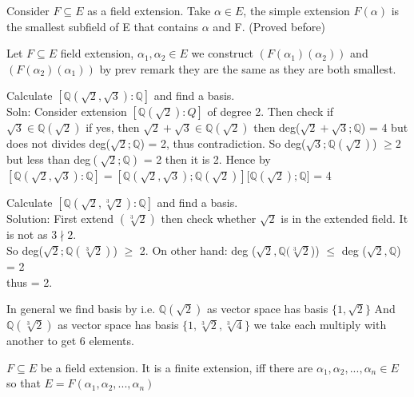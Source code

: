 \documentclass{article}
\newcommand\Q{\ensuremath{\mathbb{Q}}}
\begin{document}
\begin{note}
    Consider $F \subseteq E$ as a field extension. Take $\alpha \in E$, the simple extension $F(\alpha)$ is the smallest subfield of E that contains $\alpha$ and F. (Proved before)
\end{note}
\begin{Def}
    Let $F \subseteq E$ field extension, $\alpha_1, \alpha_2 \in E$ we construct $(F(\alpha_1)(\alpha_2))$ and $(F(\alpha_2)(\alpha_1))$ by prev remark they are the same as they are both smallest.
\end{Def}

\begin{Example}
    Calculate $[\Q(\sqrt{2}, \sqrt{3}): \Q]$ and find a basis.
  \\  Soln: Consider extension $[\Q(\sqrt{2}):Q]$ of degree 2. Then check if $\sqrt{3} \in \Q(\sqrt{2})$ if yes, then $\sqrt{2} + \sqrt{3} \in \Q(\sqrt{2})$ then deg($\sqrt{2} + \sqrt{3}; 
    \Q$) = 4 but does not divides deg($\sqrt{2}; \Q$) = 2, thus contradiction.
    So deg($\sqrt{3}; \Q(\sqrt{2})$) $\geq 2$ but less than deg$(\sqrt{2}; \Q)$ = 2 then it is 2.
    Hence by $[\Q(\sqrt{2}, \sqrt{3}):\Q] = [\Q(\sqrt{2}, \sqrt{3}); \Q(\sqrt{2})][\Q(\sqrt{2}); \Q$] = 4
\end{Example}


\begin{Example}
      Calculate $[\Q(\sqrt{2}, \sqrt[3]{2}): \Q]$ and find a basis. 
\\Solution: First extend $( \sqrt[3]{2})$ then check whether $\sqrt{2}$ is in the extended field. It is  not as $3\nmid 2$.
\\ So deg($\sqrt{2}; \Q(\sqrt[3]{2})$) $\geq$ 2. On other hand: deg ($\sqrt{2}, \Q(\sqrt[3]{2}$)) $\leq$ deg ($\sqrt{2}, \Q$) = 2 
\\ thus = 2.

\end{Example}
In general we find basis by i.e. $\Q(\sqrt{2})$ as vector space has basis $\{1, \sqrt{2}\}$
And $\Q( \sqrt[3]{2})$ as vector space has basis $\{1,  \sqrt[3]{2},  \sqrt[3]{4}\}$ we take each multiply with another to get 6 elements. 
\begin{theorem}
    $F \subseteq E$ be a field extension. It is a finite extension, iff there are $\alpha_1, \alpha_2, ..., \alpha_n \in E$ so that $E = F(\alpha_1, \alpha_2, ..., \alpha_n )$
\end{theorem}
\end{document}
